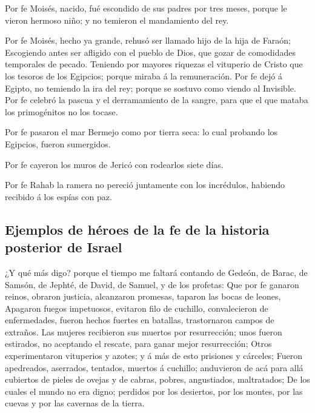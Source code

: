  Por fe Moisés, nacido, fué escondido de sus padres por
tres meses, porque le vieron hermoso niño; y no temieron el mandamiento
del rey.

 Por fe Moisés, hecho ya grande, rehusó ser llamado hijo de
la hija de Faraón;  Escogiendo antes ser afligido con el
pueblo de Dios, que gozar de comodidades temporales de pecado.
 Teniendo por mayores riquezas el vituperio de Cristo que
los tesoros de los Egipcios; porque miraba á la remuneración.
 Por fe dejó á Egipto, no temiendo la ira del rey; porque
se sostuvo como viendo al Invisible.  Por fe celebró la
pascua y el derramamiento de la sangre, para que el que mataba los
primogénitos no los tocase.

 Por fe pasaron el mar Bermejo como por tierra seca: lo
cual probando los Egipcios, fueron sumergidos.

 Por fe cayeron los muros de Jericó con rodearlos siete
días.

 Por fe Rahab la ramera no pereció juntamente con los
incrédulos, habiendo recibido á los espías con paz.

\hypertarget{ejemplos-de-huxe9roes-de-la-fe-de-la-historia-posterior-de-israel}{%
\subsection{Ejemplos de héroes de la fe de la historia posterior de
Israel}\label{ejemplos-de-huxe9roes-de-la-fe-de-la-historia-posterior-de-israel}}

 ¿Y qué más digo? porque el tiempo me faltará contando de
Gedeón, de Barac, de Samsón, de Jephté, de David, de Samuel, y de los
profetas:  Que por fe ganaron reinos, obraron justicia,
alcanzaron promesas, taparon las bocas de leones,  Apagaron
fuegos impetuosos, evitaron filo de cuchillo, convalecieron de
enfermedades, fueron hechos fuertes en batallas, trastornaron campos de
extraños.  Las mujeres recibieron sus muertos por
resurrección; unos fueron estirados, no aceptando el rescate, para ganar
mejor resurrección;  Otros experimentaron vituperios y
azotes; y á más de esto prisiones y cárceles;  Fueron
apedreados, aserrados, tentados, muertos á cuchillo; anduvieron de acá
para allá cubiertos de pieles de ovejas y de cabras, pobres,
angustiados, maltratados;  De los cuales el mundo no era
digno; perdidos por los desiertos, por los montes, por las cuevas y por
las cavernas de la tierra.

